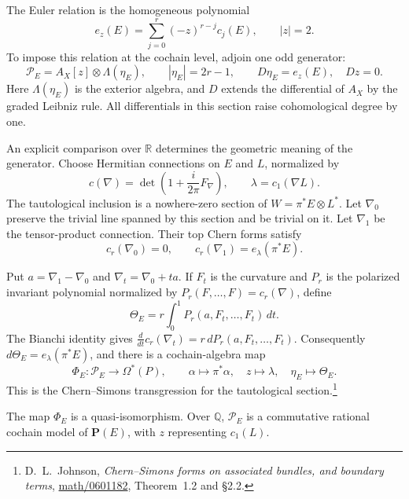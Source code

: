 The Euler relation is the homogeneous polynomial
\begin{equation}\label{df:eq:euler}
 e_z(E)=\sum_{j=0}^r(-z)^{r-j}c_j(E),\qquad |z|=2.
\end{equation}
To impose this relation at the cochain level, adjoin one odd generator:
\begin{equation}\label{df:eq:projective}
 \mathcal P_E=A_X[z]\otimes\Lambda(\eta_E),\qquad
 |\eta_E|=2r-1,\qquad D\eta_E=e_z(E),\quad Dz=0.
\end{equation}
Here $\Lambda(\eta_E)$ is the exterior algebra, and $D$ extends the
differential of $A_X$ by the graded Leibniz rule. All differentials
in this section raise cohomological degree by one.

An explicit comparison over $\mathbb R$ determines the geometric meaning
of the generator. Choose Hermitian connections on $E$ and $L$, normalized
by
\[
 c(\nabla)=\det\left(1+\frac{i}{2\pi}F_\nabla\right),
 \qquad \lambda=c_1(\nabla L).
\]
The tautological inclusion is a nowhere-zero section of
$W=\pi^*E\otimes L^*$. Let $\nabla_0$ preserve the trivial line
spanned by this section and be trivial on it. Let $\nabla_1$ be the
tensor-product connection. Their top Chern forms satisfy
\[
 c_r(\nabla_0)=0,\qquad c_r(\nabla_1)=e_\lambda(\pi^*E).
\]

Put $a=\nabla_1-\nabla_0$ and $\nabla_t=\nabla_0+ta$.
If $F_t$ is the curvature and $P_r$ is the polarized invariant
polynomial normalized by $P_r(F,\ldots,F)=c_r(\nabla)$, define
\begin{equation}\label{df:eq:transgression}
 \Theta_E=r\int_0^1P_r(a,F_t,\ldots,F_t)\,dt.
\end{equation}
The Bianchi identity gives
$\frac{d}{dt}c_r(\nabla_t)=r\,dP_r(a,F_t,\ldots,F_t)$.
Consequently $d\Theta_E=e_\lambda(\pi^*E)$, and there is a
cochain-algebra map
\begin{equation}\label{df:eq:comparison}
 \Phi_E:\mathcal P_E\longrightarrow\Omega^*(P),\qquad
 \alpha\longmapsto\pi^*\alpha,\quad z\longmapsto\lambda,
 \quad\eta_E\longmapsto\Theta_E.
\end{equation}
This is the Chern--Simons transgression for the tautological
section.\footnote{D.~L.~Johnson, \emph{Chern--Simons forms on associated bundles,
and boundary terms},
\href{https://arxiv.org/abs/math/0601182}{math/0601182},
Theorem~1.2 and \S2.2.}

\begin{theorem}\label{df:thm:projective}
The map $\Phi_E$ is a quasi-isomorphism. Over $\mathbb Q$,
$\mathcal P_E$ is a commutative rational cochain model of
$\mathbf P(E)$, with $z$ representing $c_1(L)$.
\end{theorem}

